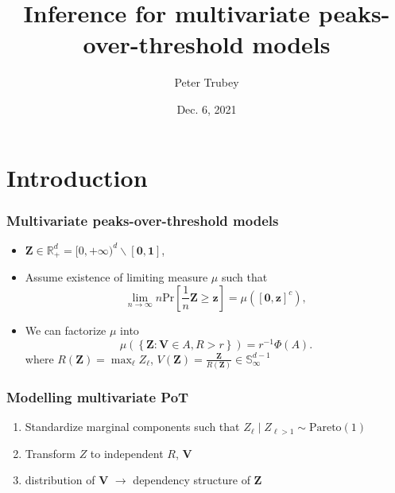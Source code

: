 \documentclass[aspectratio=169]{beamer}
\title{Inference for multivariate peaks-over-threshold models}
\author{Peter Trubey}
\institute{Bruno's Lab Meeting}
\date[12/6/2021]{Dec. 6, 2021}
\newcommand{\prob}[1]{\text{Pr}\left[#1\right]}
\begin{document}
\begin{frame}[plain]
  \titlepage
\end{frame}

\section{Introduction}
\begin{frame}
  \frametitle{Multivariate peaks-over-threshold models}
  \begin{itemize}
    \item $\bm{Z} \in {\mathbb R}^d_+ = [0,+\infty)^d\backslash[\bm{0},\bm{1}]$,
    \item Assume existence of limiting measure $\mu$ such that
      \[
        \lim\limits_{n\to\infty}n\prob{\frac{1}{n}\bm{Z}\geq \bm{z}} =
         \mu\left([\bm{0},\bm{z}]^c\right),
      \]
    \pause
    \item We can factorize $\mu$ into
      \[
        \mu\left( \left\lbrace\bm{Z} : \bm{V} \in A , R > r\right\rbrace \right) =
         r^{-1}\Phi(A).
      \]
      where $R(\bm{Z}) = \max_{\ell}Z_{\ell}$, \; $V(\bm{Z}) = \frac{\bm{Z}}{R(\bm{Z})} \in {\mathbb S}_{\infty}^{d-1}$
    \end{itemize}
\end{frame}

\begin{frame}
    \frametitle{Modelling multivariate PoT}
    \begin{enumerate}
        \item Standardize marginal components such that $Z_{\ell}\mid Z_{\ell > 1} \sim \text{Pareto}(1)$
        \item Transform $Z$ to independent $R$, $\bm{V}$
        \item distribution of $\bm{V}$ $\longrightarrow$  dependency structure of $\bm{Z}$
    \end{enumerate}
\end{frame}
\end{document}
